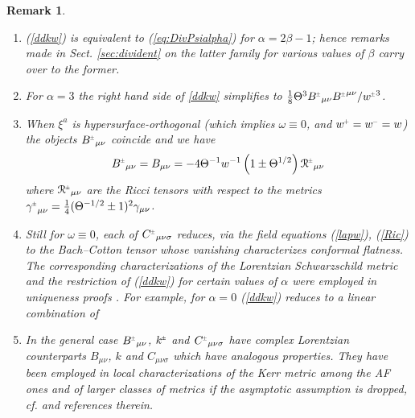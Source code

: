 \documentclass[a4paper,10pt,reqno]{amsart}
\newcommand{\cR}{\mathcal{R}}
\newcommand{\Th}{\Theta}
\newcommand{\al}{\alpha}
\newcommand{\si}{\sigma}
\theoremstyle{plain}
\newtheorem{remark}[thm]{Remark}
\renewcommand{\P}[1]{{{#1}^{\hspace{-.5pt}\scaleto{+}{4pt}}}}
\newcommand{\M}[1]{{{#1}^{\hspace{-.5pt}\scaleto{-}{4pt}}}}
\newcommand{\PM}[1]{{{#1}^{\hspace{-.5pt}\scaleto{\pm}{3.5pt}}}}
\numberwithin{equation}{section}
\begin{document}
\begin{remark}
\label{divrem}~
\begin{enumerate} 
\item (\ref{ddkw}) is equivalent to (\ref{eq:DivPsialpha}) for $\alpha = 2\beta - 1$; 
hence remarks made in Sect. \ref{sec:divident} on the latter family for various values of $\beta$ carry over  to the former.

%

%
%

%

\item
For $\al = 3$ the right hand side of \eqref{ddkw} simplifies to 
$\frac{1}{8} \Theta^{3}  \PM{B}_{\mu\nu} \PM{B}^{\mu\nu} / \PM{w}^{3}$.

\item When $\xi^{a}$ is hypersurface-orthogonal (which implies $\omega \equiv 0$, and $\P{w} = \M{w} = w$) the objects  $\PM{B}_{\mu\nu}$ coincide and we have
\begin{equation} 
 \PM{B}_{\mu\nu} = B_{\mu\nu} = - 4 \Th^{-1} w^{-1} \left (1 \pm \Th^{1/2} \right) \PM{\cR}_{\mu\nu} 
 \end{equation}
where $\PM{\cR}_{\mu\nu}$ are  the Ricci tensors with respect to the metrics 
 $\PM{\gamma}_{\mu\nu}  =  \frac{1}{4} (\Th^{- 1/2} \pm 1)^2 \gamma_{\mu\nu}$.
\item 
Still  for $\omega \equiv 0$,  each of $\PM{C}_{\mu\nu\si}$ reduces, via the field equations (\ref{lapw}), (\ref{Ric})  to the Bach--Cotton tensor whose vanishing characterizes conformal flatness.
The corresponding characterizations of the Lorentzian  Schwarzschild metric
and the restriction of (\ref{ddkw}) for certain values of $\al$  were 
employed in uniqueness proofs \cite{1967PhRv..164.1776I,MR398432}. For example, for $\al =0$  (\ref{ddkw}) reduces  to a linear combination of  \cite[Eq. (2.12)-(2.13)]{MR398432} 


\item
 In the general case
$\PM{B}_{\mu\nu}$, $\PM{k}$ and $\PM{C}_{\mu\nu\si}$  have complex Lorentzian
counterparts $B_{\mu\nu}$, $k$ and $C_{\mu\nu\si}$ which have analogous properties.
 They have been employed in local characterizations of the Kerr metric among the AF
 ones \cite{MR747036} and of  larger classes of metrics if the asymptotic  assumption is dropped, cf.  \cite{nozawa2021alternative} and references therein. 
\end{enumerate} 

\end{remark}
\end{document}
